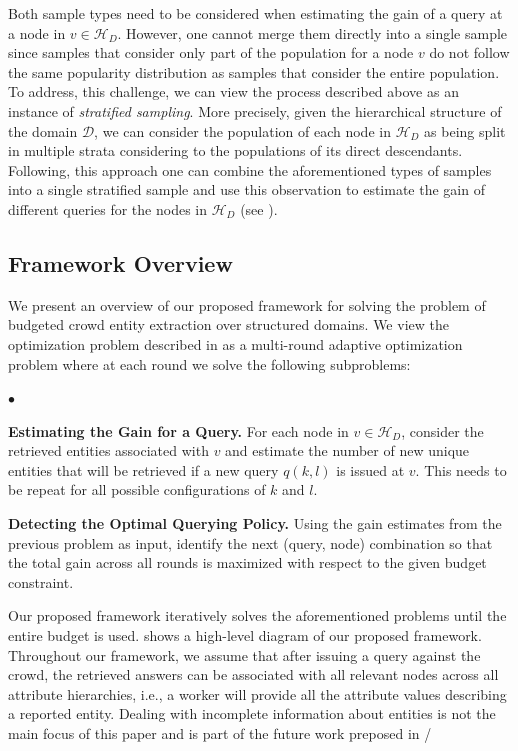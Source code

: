 \documentclass{vldb}
\newcommand{\squishlist}{
   \begin{list}{$\bullet$}
    {
      \setlength{\itemsep}{0pt}
      \setlength{\parsep}{3pt}
      \setlength{\topsep}{3pt}
      \setlength{\partopsep}{0pt}
      \setlength{\leftmargin}{1.5em}
      \setlength{\labelwidth}{1em}
      \setlength{\labelsep}{0.5em} } }
\newcommand{\squishend}{
    \end{list}  }
\newcommand{\domain}{\mathcal{D}}
\newcommand{\hierarchy}{\mathcal{H}_D}
\begin{document}
Both sample types need to be considered when estimating the gain of a query at a node in $v \in \hierarchy$. However, one cannot merge them directly into a single sample since samples that consider only part of the population for a node $v$ do not follow the same popularity distribution as samples that consider the entire population. To address, this challenge, we can view the process described above as an instance of {\em stratified sampling}. More precisely, given the hierarchical structure of the domain $\domain$, we can consider the population of each node in $\hierarchy$ as being split in multiple strata considering to the populations of its direct descendants. Following, this approach one can combine the aforementioned types of samples into a single stratified sample and use this observation to estimate the gain of different queries for the nodes in $\hierarchy$ (see ).

\subsection{Framework Overview}
\label{sec:framework}
We present an overview of our proposed framework for solving the problem of budgeted crowd entity extraction over structured domains. We view the optimization problem described in  as a multi-round adaptive optimization problem where at each round we solve the following subproblems: 
\squishlist 
\item \textbf{Estimating the Gain for a Query.} For each node in $v \in \hierarchy$, consider the retrieved entities associated with $v$ and estimate the number of new unique entities that will be retrieved if a new query $q(k,l)$ is issued at $v$. This needs to be repeat for all possible configurations of $k$ and $l$.
\item \textbf{Detecting the Optimal Querying Policy.} Using the gain estimates from the previous problem as input, identify the next (query, node) combination so that the total gain across all rounds is maximized with respect to the given budget constraint. 
\squishend
Our proposed framework iteratively solves the aforementioned problems until the entire budget is used.  shows a high-level diagram of our proposed framework. Throughout our framework, we assume that after issuing a query against the crowd, the retrieved answers can be associated with all relevant nodes across all attribute hierarchies, i.e., a worker will provide all the attribute values describing a reported entity. Dealing with incomplete information about entities is not the main focus of this paper and is part of the future work preposed in /
\end{document}
